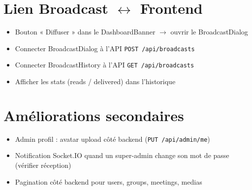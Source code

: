 \documentclass{article}
\begin{document}
\section{Lien Broadcast $\leftrightarrow$ Frontend}
\label{sec:broadcast-link}

\begin{itemize}[leftmargin=*, labelsep=0.5em]
  \item[\textbullet] Bouton « Diffuser » dans le DashboardBanner $\rightarrow$ ouvrir le BroadcastDialog
  \item[\textbullet] Connecter BroadcastDialog à l'API \texttt{POST /api/broadcasts}
  \item[\textbullet] Connecter BroadcastHistory à l'API \texttt{GET /api/broadcasts}
  \item[\textbullet] Afficher les stats (reads / delivered) dans l'historique
\end{itemize}

\section{Améliorations secondaires}
\label{sec:improvements}

\begin{itemize}[leftmargin=*, labelsep=0.5em]
  \item[\textbullet] Admin profil : avatar upload côté backend (\texttt{PUT /api/admin/me})
  \item[\textbullet] Notification Socket.IO quand un super-admin change son mot de passe (vérifier réception)
  \item[\textbullet] Pagination côté backend pour users, groups, meetings, medias
\end{itemize}
\end{document}

